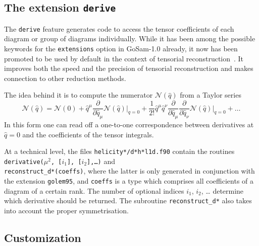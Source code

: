\documentclass[11pt,a4paper]{refrep}
\newcommand{\gosam}{{\sc GoSam}\xspace}
\begin{document}
\subsection{The extension {\tt derive}}

The {\tt derive} feature generates code to access the tensor coefficients
of each diagram or group of diagrams individually.
While it has been among the possible keywords for the 
{\tt extensions} option in \gosam-1.0 already, it now has been promoted to 
be used by default in the context of  tensorial reconstruction~\cite{Heinrich:2010ax}.
It improves both the speed and the
precision of tensorial reconstruction and makes connection to other reduction methods.

The idea behind it is to compute the numerator $\mathcal{N}(\hat{q})$ 
from a Taylor series
\begin{equation}
\mathcal{N}(\hat{q})=\mathcal{N}(0)
+ \hat{q}^\mu
  \frac{\partial}{\partial\hat{q}_\mu}\mathcal{N}(\hat{q})\vert_{q=0}
+ \frac1{2!}\hat{q}^\mu\hat{q}^\nu
  \frac{\partial}{\partial\hat{q}_\mu}
  \frac{\partial}{\partial\hat{q}_\nu}
  \mathcal{N}(\hat{q})\vert_{q=0} + \ldots
\end{equation}
In this form one can read off a one-to-one correspondence between derivatives at
$\hat{q}=0$ and the coefficients of the tensor integrals.

At a technical level, 
the files \texttt{helicity*/d*h*l1d.f90} contain the routines
\texttt{derivative($\mu^2$, [$i_1$], [$i_2$],\dots)} and\\
\texttt{reconstruct\_d*(coeffs)}, where the latter is only generated in
conjunction with the extension \texttt{golem95}, and \texttt{coeffs} is
a type which comprises all coefficients of a diagram of a certain rank.
The number of optional indices $i_1$, $i_2$, \dots 
determine which derivative should be returned. The subroutine
\texttt{reconstruct\_d*} also takes into account the proper symmetrisation.

\subsection{Customization}\label{sec:Customization}
\end{document}
